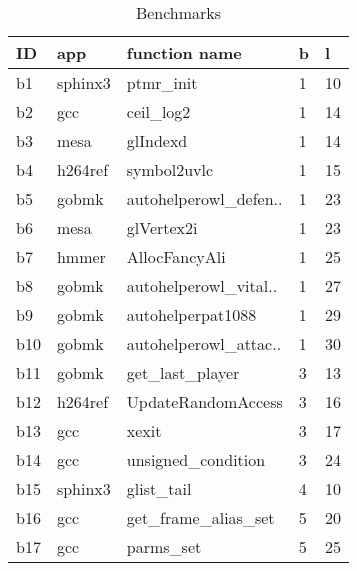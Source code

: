 \begin{longtable}{|l|l|l|l|l|}
\caption{\label{tab:benchmarks}{Benchmarks}}\\
\hline
{ID}&{app}&{function name}&{b}&{l}\\
\hline
b1&sphinx3&ptmr\_init&1&10
\\
b2&gcc&ceil\_log2&1&14
\\
b3&mesa&glIndexd&1&14
\\
b4&h264ref&symbol2uvlc&1&15
\\
b5&gobmk&autohelperowl\_defen..&1&23
\\
b6&mesa&glVertex2i&1&23
\\
b7&hmmer&AllocFancyAli&1&25
\\
b8&gobmk&autohelperowl\_vital..&1&27
\\
b9&gobmk&autohelperpat1088&1&29
\\
b10&gobmk&autohelperowl\_attac..&1&30
\\
b11&gobmk&get\_last\_player&3&13
\\
b12&h264ref&UpdateRandomAccess&3&16
\\
b13&gcc&xexit&3&17
\\
b14&gcc&unsigned\_condition&3&24
\\
b15&sphinx3&glist\_tail&4&10
\\
b16&gcc&get\_frame\_alias\_set&5&20
\\
b17&gcc&parms\_set&5&25
\\
\hline
\end{longtable}
